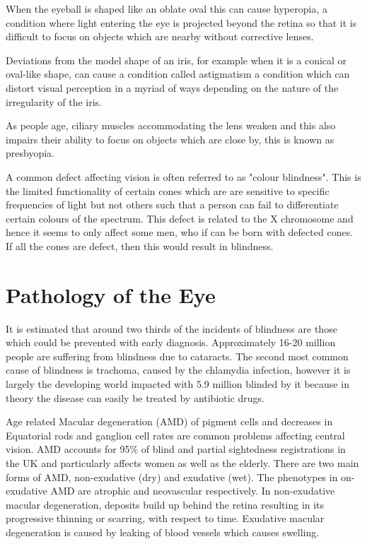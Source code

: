 When the eyeball is shaped like an oblate oval this can cause hyperopia,
a condition where light entering the eye is projected beyond the retina so
that it is difficult to focus on objects which are nearby without corrective
lenses.

Deviations from the model shape of an iris, for example when it is a conical
or oval-like shape, can cause a condition called astigmatism a condition which
can distort visual perception in a myriad of ways depending on the nature of
the irregularity of the iris.

As people age, ciliary muscles accommodating the lens weaken and
this also impairs their ability to focus on objects which are close by, this is
known as presbyopia. \cite{fisher1985ciliary}

A common defect affecting vision is often referred to as "colour blindness".
This is the limited functionality of certain cones which are are sensitive
to specific frequencies of light but not others such that a person can fail
to differentiate certain colours of the spectrum. This defect is related to
the X chromosome and hence it seems to only affect some men, who if
can be born with defected cones.\cite{george1996clinical} If all the cones
are defect, then this would result in blindness.

\section{Pathology of the Eye}

It is estimated that around two thirds of the incidents of blindness are those
which could be prevented with early diagnosis.\cite{west2000looking}
Approximately 16-20 million people are suffering from blindness due to
cataracts.\cite{west2000looking} The second most common cause of
blindness is trachoma, caused by the chlamydia infection, however it is
largely the developing world impacted with 5.9 million blinded by it
because in theory the disease can easily be treated by antibiotic drugs.
\cite{west2000looking}

Age related Macular degeneration (AMD) of pigment cells and
decreases in Equatorial rods and ganglion cell rates are common
problems affecting central vision.\cite{gao1992aging} AMD accounts
for 95\% of blind and partial sightedness registrations in the UK
and particularly affects women as well as the elderly.
\cite{o1998age,klein2005complement,west2000looking}
There are two main forms of AMD, non-exudative (dry) and exudative
(wet). The phenotypes in on-exudative AMD are atrophic and neovascular
respectively.\cite{kuno2011dry} In non-exudative macular degeneration,
deposits build up behind the retina resulting in its progressive thinning or
scarring, with respect to time. Exudative macular degeneration is caused
by leaking of blood vessels which causes swelling.

